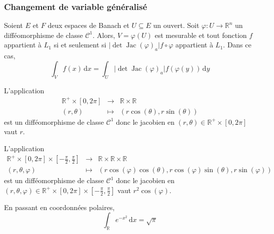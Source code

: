 	\subsubsection{Changement de variable généralisé}


	\begin{theorem}
		Soient $E$ et $F$ deux espaces de Banach et $U \subseteq E$ un ouvert.
		Soit $\varphi : U \rightarrow \mathbb{R}^n$ un difféomorphisme de classe $\mathcal{C}^1$. Alors, $V = \varphi(U)$ est mesurable et tout fonction $f$ appartient à $L_1$ si et seulement si $\vert \det \operatorname{Jac}(\varphi)_a \vert f \circ \varphi$ appartient à $L_1$. Dans ce cas,
		\[ \int_V f(x) \, \mathrm{d}x = \int_U \vert \det \operatorname{Jac}(\varphi)_a \vert f (\varphi(y)) \, \mathrm{d}y \]
	\end{theorem}


	\begin{example}
		L'application
		\[
			\begin{array}{ccc}
				\mathbb{R}^+ \times [0,2\pi] &\rightarrow& \mathbb{R} \times \mathbb{R} \\
				(r,\theta) &\mapsto& (r\cos(\theta), r\sin(\theta))
			\end{array}
		\]
		est un difféomorphisme de classe $\mathcal{C}^1$ donc le jacobien en $(r,\theta) \in \mathbb{R}^+ \times [0,2\pi]$ vaut $r$.
	\end{example}

	\begin{example}
		L'application
		\[
			\begin{array}{ccc}
				\mathbb{R}^+ \times [0,2\pi] \times \left[ -\frac{\pi}{2}, \frac{\pi}{2} \right] &\rightarrow& \mathbb{R} \times \mathbb{R} \times \mathbb{R} \\
				(r,\theta,\varphi) &\mapsto& (r\cos(\varphi)\cos(\theta), r\cos(\varphi)\sin(\theta), r\sin(\varphi))
			\end{array}
		\]
		est un difféomorphisme de classe $\mathcal{C}^1$ donc le jacobien en $(r,\theta,\varphi) \in \mathbb{R}^+ \times [0,2\pi] \times \left[ -\frac{\pi}{2}, \frac{\pi}{2} \right]$ vaut $r^2 \cos(\varphi)$.
	\end{example}

	\begin{application}
		En passant en coordonnées polaires,
		\[ \int_{\mathbb{R}} e^{-x^2} \, \mathrm{d}x = \sqrt{\pi} \]
	\end{application}

